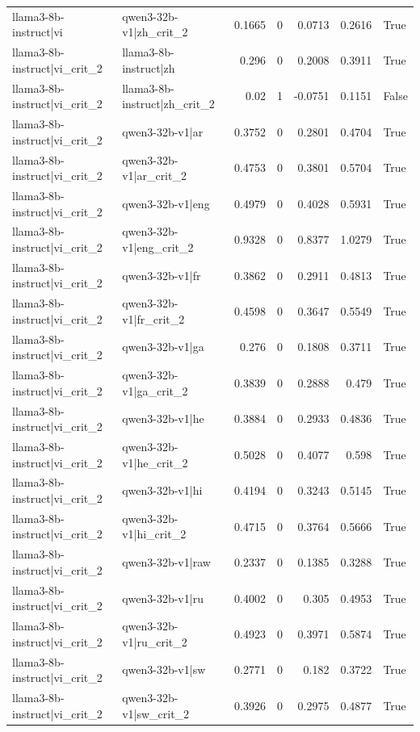 \begin{table}
\begin{tabular}{l l r r r r l}
llama3-8b-instruct|vi & qwen3-32b-v1|zh_crit_2 & 0.1665 & 0 & 0.0713 & 0.2616 & True \\
llama3-8b-instruct|vi_crit_2 & llama3-8b-instruct|zh & 0.296 & 0 & 0.2008 & 0.3911 & True \\
llama3-8b-instruct|vi_crit_2 & llama3-8b-instruct|zh_crit_2 & 0.02 & 1 & -0.0751 & 0.1151 & False \\
llama3-8b-instruct|vi_crit_2 & qwen3-32b-v1|ar & 0.3752 & 0 & 0.2801 & 0.4704 & True \\
llama3-8b-instruct|vi_crit_2 & qwen3-32b-v1|ar_crit_2 & 0.4753 & 0 & 0.3801 & 0.5704 & True \\
llama3-8b-instruct|vi_crit_2 & qwen3-32b-v1|eng & 0.4979 & 0 & 0.4028 & 0.5931 & True \\
llama3-8b-instruct|vi_crit_2 & qwen3-32b-v1|eng_crit_2 & 0.9328 & 0 & 0.8377 & 1.0279 & True \\
llama3-8b-instruct|vi_crit_2 & qwen3-32b-v1|fr & 0.3862 & 0 & 0.2911 & 0.4813 & True \\
llama3-8b-instruct|vi_crit_2 & qwen3-32b-v1|fr_crit_2 & 0.4598 & 0 & 0.3647 & 0.5549 & True \\
llama3-8b-instruct|vi_crit_2 & qwen3-32b-v1|ga & 0.276 & 0 & 0.1808 & 0.3711 & True \\
llama3-8b-instruct|vi_crit_2 & qwen3-32b-v1|ga_crit_2 & 0.3839 & 0 & 0.2888 & 0.479 & True \\
llama3-8b-instruct|vi_crit_2 & qwen3-32b-v1|he & 0.3884 & 0 & 0.2933 & 0.4836 & True \\
llama3-8b-instruct|vi_crit_2 & qwen3-32b-v1|he_crit_2 & 0.5028 & 0 & 0.4077 & 0.598 & True \\
llama3-8b-instruct|vi_crit_2 & qwen3-32b-v1|hi & 0.4194 & 0 & 0.3243 & 0.5145 & True \\
llama3-8b-instruct|vi_crit_2 & qwen3-32b-v1|hi_crit_2 & 0.4715 & 0 & 0.3764 & 0.5666 & True \\
llama3-8b-instruct|vi_crit_2 & qwen3-32b-v1|raw & 0.2337 & 0 & 0.1385 & 0.3288 & True \\
llama3-8b-instruct|vi_crit_2 & qwen3-32b-v1|ru & 0.4002 & 0 & 0.305 & 0.4953 & True \\
llama3-8b-instruct|vi_crit_2 & qwen3-32b-v1|ru_crit_2 & 0.4923 & 0 & 0.3971 & 0.5874 & True \\
llama3-8b-instruct|vi_crit_2 & qwen3-32b-v1|sw & 0.2771 & 0 & 0.182 & 0.3722 & True \\
llama3-8b-instruct|vi_crit_2 & qwen3-32b-v1|sw_crit_2 & 0.3926 & 0 & 0.2975 & 0.4877 & True \\

\end{tabular}
\end{table}
